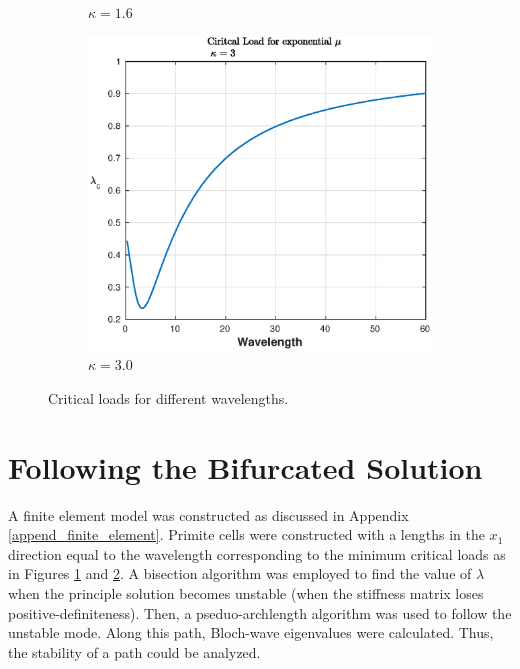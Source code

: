 \documentclass[11pt]{report}
\begin{document}
\begin{figure}[!htb]
\begin{subfigure}[b]{0.33\textwidth}
		\caption{$\kappa = 1.6$}
		\label{fig:crit_load_kappa_1_6}
	\end{subfigure}
	\begin{subfigure}[b]{0.33\textwidth}
		\includegraphics[width=\textwidth]{crit_load_kappa_3_0}
		\caption{$\kappa = 3.0$}
		\label{fig:crit_load_kappa_3_0}
	\end{subfigure}
	\caption{Critical loads for different wavelengths.}
    \label{fig:crit_load}
\end{figure}

\newpage
\section{Following the Bifurcated Solution}

	A finite element model was constructed as discussed in Appendix \ref{append_finite_element}. Primite cells were constructed with a lengths in the $x_1$ direction equal to the wavelength corresponding to the minimum critical loads as in Figures \ref{fig:crit_load_kappa_1_6} and \ref{fig:crit_load_kappa_3_0}. A bisection algorithm was employed to find the value of $\lambda$ when the principle solution becomes unstable (when the stiffness matrix loses positive-definiteness). Then, a pseduo-archlength algorithm was used to follow the unstable mode. Along this path, Bloch-wave eigenvalues were calculated. Thus, the stability of a path could be analyzed.
\end{document}

